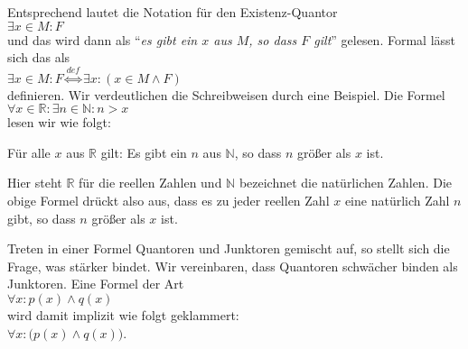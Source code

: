\begin{enumerate}
      Entsprechend
      lautet die Notation f\"{u}r den Existenz-Quantor \\[0.2cm]
      \hspace*{1.3cm}  $\exists x \in M: F$ \\[0.2cm]
      und das wird dann  als ``\emph{es gibt ein $x$ aus $M$, so dass $F$ gilt}'' gelesen.  
      Formal l\"{a}sst sich das als \\[0.2cm]
      \hspace*{1.3cm} $\exists x \in M: F \stackrel{de\!f}{\Longleftrightarrow} \exists x\colon (x\in M \wedge F)$ \\[0.2cm]
      definieren.       Wir verdeutlichen die Schreibweisen durch eine Beispiel.  Die Formel \\[0.2cm]
      \hspace*{1.3cm} $\forall x \in \mathbb{R}: \exists n \in \mathbb{N} : n > x$ \\[0.2cm]
      lesen wir wie folgt:
      \begin{center}
        {\em
        \begin{minipage}{12cm}
          F\"{u}r alle $x$ aus $\mathbb{R}$ gilt: Es gibt ein $n$ aus $\mathbb{N}$, so dass
          $n$ gr\"{o}ßer als $x$ ist.
        \end{minipage}
        }
      \end{center}
      Hier steht $\mathbb{R}$ f\"{u}r die reellen Zahlen und $\mathbb{N}$ bezeichnet die nat\"{u}rlichen Zahlen.
      Die obige Formel dr\"{u}ckt also aus, dass es zu jeder reellen Zahl $x$ eine nat\"{u}rlich Zahl $n$ gibt, 
      so dass $n$ gr\"{o}ßer als $x$ ist.

      Treten in einer Formel Quantoren und Junktoren gemischt auf, so stellt sich die
      Frage, was st\"{a}rker bindet.  Wir vereinbaren, dass Quantoren schw\"{a}cher binden als
      Junktoren.  Eine Formel der Art \\[0.2cm]
      \hspace*{1.3cm} $\forall x \colon p(x) \wedge q(x)$ \\[0.2cm]
      wird damit implizit wie folgt geklammert: \\[0.2cm]
      \hspace*{1.3cm} $\forall x \colon \bigl(p(x) \wedge q(x)\bigr)$. 
\end{enumerate}

